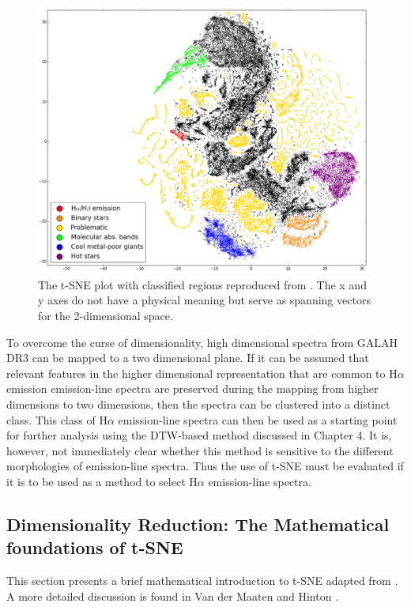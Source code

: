 \begin{figure}[!htb]
\centering
\includegraphics[scale=0.40]{figures/tsne traven.png}
\caption{The t-SNE plot with classified regions reproduced from \citet{traven2017galah}. The x and y axes do not have a physical meaning but serve as spanning vectors for the 2-dimensional space.}
\label{fig5.1}
\end{figure}

To overcome the curse of dimensionality, high dimensional spectra from GALAH DR3 can be mapped to a two dimensional plane. If it can be assumed that relevant features in the higher dimensional representation that are common to H$\alpha$ emission emission-line spectra are preserved during the mapping from higher dimensions to two dimensions, then the spectra can be clustered into a distinct class. This class of H$\alpha$ emission-line spectra can then be used as a starting point for further analysis using the DTW-based method discussed in Chapter 4. It is, however, not immediately clear whether this method is sensitive to the different morphologies of emission-line spectra. Thus the use of t-SNE must be evaluated if it is to be used as a method to select H$\alpha$ emission-line spectra.

\subsection{Dimensionality Reduction: The Mathematical foundations of t-SNE}

This section presents a brief mathematical introduction to t-SNE adapted from \citet{traven2017galah}. A more detailed discussion is found in Van der Maaten and Hinton \citep{van2008visualizing}. 

